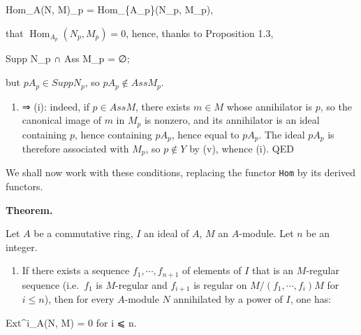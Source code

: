 \documentclass[
]{article}
\newenvironment{Shaded}{}{}
\newcommand{\NormalTok}[1]{#1}
\providecommand{\tightlist}{%
  \setlength{\itemsep}{0pt}\setlength{\parskip}{0pt}}
\begin{document}
\begin{Shaded}
\begin{Highlighting}[]
\NormalTok{Hom\_A(N, M)\_p = Hom\_\{A\_p\}(N\_p, M\_p),}
\end{Highlighting}
\end{Shaded}

that \(\operatorname{Hom}_{A_{p}}(N_{p}, M_{p}) = 0\), hence, thanks to
Proposition 1.3,

\begin{Shaded}
\begin{Highlighting}[]
\NormalTok{Supp N\_p ∩ Ass M\_p = ∅;}
\end{Highlighting}
\end{Shaded}

but \(pA_{p} \in Supp N_{p}\), so \(pA_{p} \notin Ass M_{p}\).

\begin{enumerate}
\def\labelenumi{(\alph{enumi})}
\setcounter{enumi}{21}
\tightlist
\item
  ⇒ (i): indeed, if \(p \in Ass M\), there exists \(m \in M\) whose
  annihilator is \(p\), so the canonical image of \(m\) in \(M_{p}\) is
  nonzero, and its annihilator is an ideal containing \(p\), hence
  containing \(pA_{p}\), hence equal to \(pA_{p}\). The ideal \(pA_{p}\)
  is therefore associated with \(M_{p}\), so \(p \notin Y\) by (v),
  whence (i). QED
\end{enumerate}

We shall now work with these conditions, replacing the functor
\texttt{Hom} by its derived functors.

\textbf{Theorem.}

Let \(A\) be a commutative ring, \(I\) an ideal of \(A\), \(M\) an
\(A\)-module. Let \(n\) be an integer.

\begin{enumerate}
\def\labelenumi{\alph{enumi})}
\tightlist
\item
  If there exists a sequence \(f_{1}, \cdots, f_{n+1}\) of elements of
  \(I\) that is an \(M\)-regular sequence (i.e.~\(f_{1}\) is
  \(M\)-regular and \(f_{i+1}\) is regular on
  \(M/(f_{1}, \cdots, f_{i})M\) for \(i \leqslant n\)), then for every
  \(A\)-module \(N\) annihilated by a power of \(I\), one has:
\end{enumerate}

\begin{Shaded}
\begin{Highlighting}[]
\NormalTok{Ext\^{}i\_A(N, M) = 0 for i ⩽ n.}
\end{Highlighting}
\end{Shaded}
\end{document}
